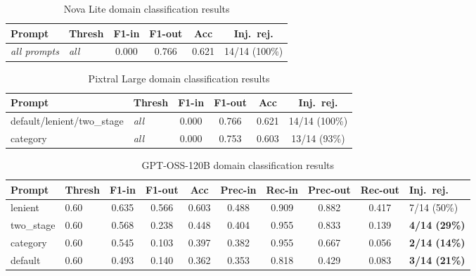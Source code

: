 
\begin{table}[ht]
\centering
\caption{Nova Lite domain classification results}
\label{tab:nova-lite-results}
\begin{tabular}{llcccc}
\toprule
Prompt & Thresh & F1-in & F1-out & Acc & Inj.\ rej. \\
\midrule
\emph{all prompts} & \emph{all} & 0.000 & 0.766 & 0.621 & 14/14 (100\%) \\
\bottomrule
\end{tabular}
\end{table}



\begin{table}[ht]
\centering
\caption{Pixtral Large domain classification results}
\label{tab:pixtral-results}
\begin{tabular}{llcccc}
\toprule
Prompt & Thresh & F1-in & F1-out & Acc & Inj.\ rej. \\
\midrule
default/lenient/two\_stage & \emph{all} & 0.000 & 0.766 & 0.621 & 14/14 (100\%) \\
category                   & \emph{all} & 0.000 & 0.753 & 0.603 & 13/14 (93\%) \\
\bottomrule
\end{tabular}
\end{table}



\begin{table}[ht]
\centering
\caption{GPT-OSS-120B domain classification results}
\label{tab:gpt-oss-results}
\begin{tabular}{llcccccccl}
\toprule
Prompt & Thresh & F1-in & F1-out & Acc & Prec-in & Rec-in & Prec-out & Rec-out & Inj.\ rej. \\
\midrule
lenient    & 0.60 & 0.635 & 0.566 & 0.603 & 0.488 & 0.909 & 0.882 & 0.417 & 7/14 (50\%) \\
two\_stage & 0.60 & 0.568 & 0.238 & 0.448 & 0.404 & 0.955 & 0.833 & 0.139 & \textbf{4/14 (29\%)} \\
category   & 0.60 & 0.545 & 0.103 & 0.397 & 0.382 & 0.955 & 0.667 & 0.056 & \textbf{2/14 (14\%)} \\
default    & 0.60 & 0.493 & 0.140 & 0.362 & 0.353 & 0.818 & 0.429 & 0.083 & \textbf{3/14 (21\%)} \\
\bottomrule
\end{tabular}
\end{table}


